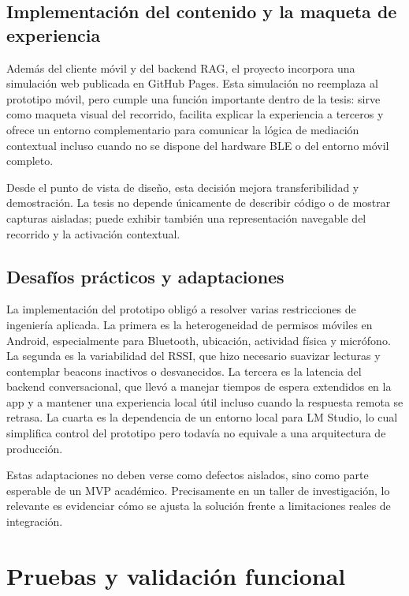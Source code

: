 \subsection{Implementación del contenido y la maqueta de experiencia}

Además del cliente móvil y del backend RAG, el proyecto incorpora una simulación web publicada en GitHub Pages. Esta simulación no reemplaza al prototipo móvil, pero cumple una función importante dentro de la tesis: sirve como maqueta visual del recorrido, facilita explicar la experiencia a terceros y ofrece un entorno complementario para comunicar la lógica de mediación contextual incluso cuando no se dispone del hardware BLE o del entorno móvil completo.

Desde el punto de vista de diseño, esta decisión mejora transferibilidad y demostración. La tesis no depende únicamente de describir código o de mostrar capturas aisladas; puede exhibir también una representación navegable del recorrido y la activación contextual.

\subsection{Desafíos prácticos y adaptaciones}

La implementación del prototipo obligó a resolver varias restricciones de ingeniería aplicada. La primera es la heterogeneidad de permisos móviles en Android, especialmente para Bluetooth, ubicación, actividad física y micrófono. La segunda es la variabilidad del RSSI, que hizo necesario suavizar lecturas y contemplar beacons inactivos o desvanecidos. La tercera es la latencia del backend conversacional, que llevó a manejar tiempos de espera extendidos en la app y a mantener una experiencia local útil incluso cuando la respuesta remota se retrasa. La cuarta es la dependencia de un entorno local para LM Studio, lo cual simplifica control del prototipo pero todavía no equivale a una arquitectura de producción.

Estas adaptaciones no deben verse como defectos aislados, sino como parte esperable de un MVP académico. Precisamente en un taller de investigación, lo relevante es evidenciar cómo se ajusta la solución frente a limitaciones reales de integración.

\section{Pruebas y validación funcional}


